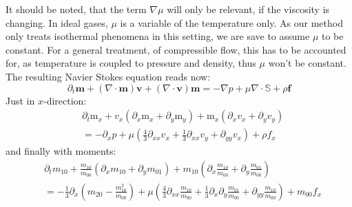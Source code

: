 It should be noted, that the term $\nabla \mu$ will only be relevant, if the viscosity is changing.
In ideal gases, $\mu$ is a variable of the temperature only.
As our method only treats isothermal phenomena in this setting, we are save to assume $\mu$ to be constant.
For a general treatment, of compressible flow, this has to be accounted for, as temperature is coupled to pressure and density, thus $\mu$ won't be constant.
The resulting Navier Stokes equation reads now:
\begin{equation}
  \label{eq:compressible NS isotherm}
  \partial_t \mathbf{m} + (\nabla \cdot \mathbf{m})\mathbf{v} + (\nabla \cdot \mathbf{v})\mathbf{m}
    = - \nabla p + \mu \nabla \cdot \mathbb{S} + \rho \mathbf{f}
\end{equation}
Just in $x$-direction:
\begin{equation}
  \begin{aligned}
    & \partial_t \text{m}_x
    + v_x (\partial_x \text{m}_x + \partial_y \text{m}_y)
    + \text{m}_x (\partial_x v_x + \partial_y v_y)  \\
    & =
     - \partial_x p
     + \mu \left(\frac{4}{3}\partial_{xx}v_x
            + \frac{1}{3}\partial_{xx} v_y
            + \partial_{yy} v_x \right)  + \rho f_x
  \end{aligned}
\end{equation}
and finally with moments:
\begin{equation}
  \begin{aligned}
    & \partial_t m_{10}
    + \frac{m_{10}}{m_{00}} (\partial_x m_{10} + \partial_y m_{01})
    + m_{10} (\partial_x \frac{m_{10}}{m_{00}} + \partial_y \frac{m_{01}}{m_{00}})  \\
    & =
    - \frac{1}{3} \partial_x \left(m_{20} - \frac{ m_{10}^2 }{ m_{00} } \right)
     + \mu \left(\frac{4}{3}\partial_{xx}\frac{m_{10}}{m_{00}}
            + \frac{1}{3}\partial_x\partial_y \frac{m_{01}}{m_{00}}
            + \partial_{yy} \frac{m_{10}}{m_{00}} \right) + m_{00}f_x
  \end{aligned}
\end{equation}
